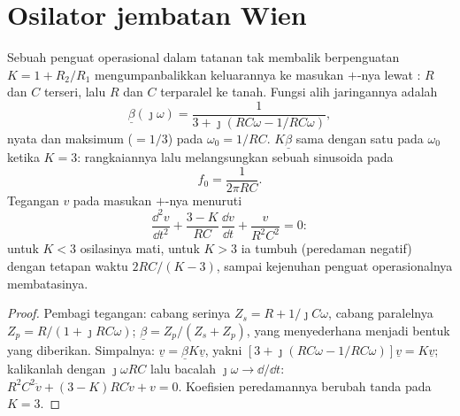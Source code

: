 \section{Osilator jembatan Wien}

\begin{proposition}\label{prop:b2:feedback-oscillators:wien}
Sebuah penguat operasional dalam tatanan tak membalik berpenguatan $K = 1 + R_2/R_1$
mengumpanbalikkan keluarannya ke masukan $+$-nya lewat \emph{}:
$R$ dan $C$ terseri, lalu $R$ dan $C$ terparalel ke tanah. Fungsi alih
jaringannya adalah
\[
\underline\beta(\jmath\omega) = \frac1{3 + \jmath(RC\omega - 1/RC\omega)} ,
\]
nyata dan maksimum ($= 1/3$) pada $\omega_0 = 1/RC$.  $K\underline\beta$
sama dengan satu pada $\omega_0$ ketika $K = 3$: rangkaiannya lalu melangsungkan
sebuah sinusoida pada
\[
f_0 = \frac1{2\pi RC} .
\]
Tegangan $v$ pada masukan $+$-nya menuruti
\[
\frac{\dd^2v}{\dd t^2} + \frac{3 - K}{RC}\,\frac{\dd v}{\dd t} + \frac{v}{R^2C^2} = 0 :
\]
untuk $K < 3$ osilasinya mati, untuk $K > 3$ ia tumbuh (peredaman
negatif) dengan tetapan waktu $2RC/(K - 3)$, sampai kejenuhan penguat
operasionalnya membatasinya.
\end{proposition}

\begin{proof}
Pembagi tegangan: cabang serinya $Z_s = R + 1/\jmath C\omega$, cabang
paralelnya $Z_p = R/(1 + \jmath RC\omega)$; $\underline\beta = Z_p/(Z_s + Z_p)$, yang
menyederhana menjadi bentuk yang diberikan. Simpalnya: $\underline v = \underline\beta K\underline v$, yakni
$[3 + \jmath(RC\omega - 1/RC\omega)]\underline v = K\underline v$; kalikanlah dengan $\jmath\omega RC$
lalu bacalah $\jmath\omega \to \dd/\dd t$: $R^2C^2\ddot v + (3 - K)RC\dot v + v = 0$.
Koefisien peredamannya berubah tanda pada $K = 3$.
\end{proof}

